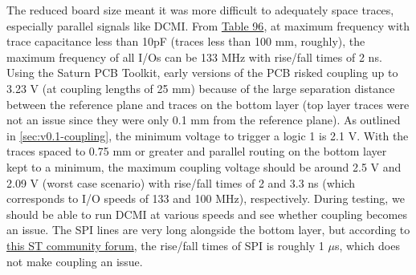 The reduced board size meant it was more difficult to adequately space traces, especially parallel signals like DCMI. From \href{https://www.st.com/resource/en/datasheet/stm32u575ag.pdf}{Table 96}, at maximum frequency with trace capacitance less than 10pF (traces less than 100 mm, roughly), the maximum frequency of all I/Os can be 133 MHz with rise/fall times of 2 ns. Using the Saturn PCB Toolkit, early versions of the PCB risked coupling up to 3.23 V (at coupling lengths of 25 mm) because of the large separation distance between the reference plane and traces on the bottom layer (top layer traces were not an issue since they were only 0.1 mm from the reference plane). As outlined in \autoref{sec:v0.1-coupling}, the minimum voltage to trigger a logic 1 is 2.1 V. With the traces spaced to 0.75 mm or greater and parallel routing on the bottom layer kept to a minimum, the maximum coupling voltage should be around 2.5 V and 2.09 V (worst case scenario) with rise/fall times of 2 and 3.3 ns (which corresponds to I/O speeds of 133 and 100 MHz), respectively. During testing, we should be able to run DCMI at various speeds and see whether coupling becomes an issue. The SPI lines are very long alongside the bottom layer, but according to \href{https://community.st.com/t5/stm32-mcus-products/spi-raise-fall-time/td-p/478910}{this ST community forum}, the rise/fall times of SPI is roughly 1 $\mu$s, which does not make coupling an issue.